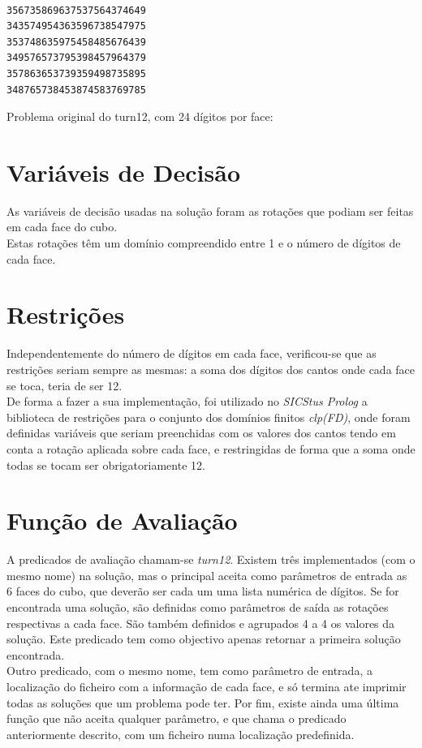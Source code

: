 \begin{f_exemplo}[H]
\begin{verbatim}

356735869637537564374649
343574954363596738547975
353748635975458485676439
349576573795398457964379
357863653739359498735895
348765738453874583769785
\end{verbatim}
\caption{Problema original do turn12, com 24 dígitos por face:}
\end{f_exemplo}



\section{Variáveis de Decisão}
\label{restr:1}

As variáveis de decisão usadas na solução foram as rotações que podiam ser feitas em cada face do cubo.\\
Estas rotações têm um domínio compreendido entre 1 e o número de dígitos de cada face.

\section{Restrições}
\label{restr:2}

Independentemente do número de dígitos em cada face, verificou-se que as restrições seriam sempre as mesmas: a soma dos dígitos dos cantos onde cada face se toca, teria de ser 12.\\

De forma a fazer a sua implementação, foi utilizado no \textit{SICStus Prolog} a biblioteca de restrições para o conjunto dos domínios finitos \textit{clp(FD)}, onde foram definidas variáveis que seriam preenchidas com os valores dos cantos tendo em conta a rotação aplicada sobre cada face, e restringidas de forma que a soma onde todas se tocam ser obrigatoriamente 12.

\section{Função de Avaliação}
\label{restr:3}

A predicados de avaliação chamam-se \textit{turn12}. Existem três implementados (com o mesmo nome) na solução, mas o principal aceita como parâmetros de entrada as 6 faces do cubo, que deverão ser cada um uma lista numérica de dígitos. Se for encontrada uma solução, são definidas como parâmetros de saída as rotações respectivas a cada face. São também definidos e agrupados 4 a 4 os valores da solução. Este predicado tem como objectivo apenas retornar a primeira solução encontrada.\\
Outro predicado, com o mesmo nome, tem como parâmetro de entrada, a localização do ficheiro com a informação de cada face, e só termina ate imprimir todas as soluções que um problema pode ter.
Por fim, existe ainda uma última função que não aceita qualquer parâmetro, e que chama o predicado anteriormente descrito, com um ficheiro numa localização predefinida.


